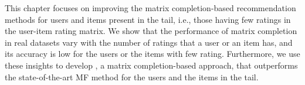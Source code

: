 This chapter focuses on improving the matrix completion-based 
recommendation methods for users and items present in 
the tail, i.e., those having few ratings in the user-item rating matrix.
We show that the performance of matrix completion in real datasets
vary with the number of ratings that a user or an item has, and its accuracy is
 low for the users or the items with few rating.  
Furthermore, we use these insights to develop \emph{\TMF},
a matrix completion-based approach, that outperforms the 
state-of-the-art MF method for the users and the items 
in the tail.